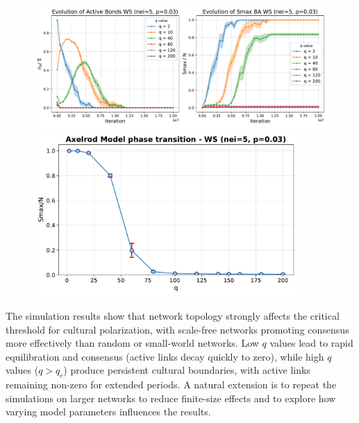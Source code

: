 \begin{figure}[htbp]
    \centering
    \begin{minipage}{0.58\textwidth}
        \centering
        \includegraphics[width=1.\textwidth]{figures/task30_plots/evolution_plot_WS.pdf}
    \end{minipage}
    \hfill
    \begin{minipage}{0.4\textwidth}
        \centering
        \includegraphics[width=0.9\textwidth]{figures/task30_plots/phase_transition_WS.pdf}
    \end{minipage}
\end{figure}
The simulation results show that network topology strongly affects the critical threshold for cultural polarization, with scale-free networks promoting consensus more effectively than random or small-world networks. Low $q$ values lead to rapid equilibration and consensus (active links decay quickly to zero), while high $q$ values ($q > q_c$) produce persistent cultural boundaries, with active links remaining non-zero for extended periods. A natural extension is to repeat the simulations on larger networks to reduce finite-size effects and to explore how varying model parameters influences the results.



\newpage
